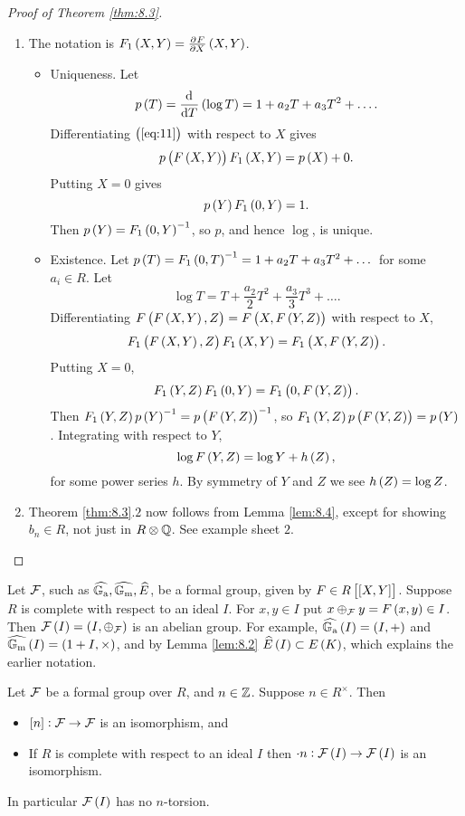 \pagebreak

\begin{proof}[Proof of Theorem \ref{thm:8.3}]
\hfill
\begin{enumerate}
\item The notation is $ F_1\br{X, Y} = \tpd{F}{X}\br{X, Y} $.
\begin{itemize}
\item Uniqueness. Let
$$ p\br{T} = \dod{}{T}\br{\log T} = 1 + a_2T + a_3T^2 + \dots. $$
Differentiating $ \br{\ref{eq:11}} $ with respect to $ X $ gives
$$ p\br{F\br{X, Y}}F_1\br{X, Y} = p\br{X} + 0. $$
Putting $ X = 0 $ gives
$$ p\br{Y}F_1\br{0, Y} = 1. $$
Then $ p\br{Y} = F_1\br{0, Y}^{-1} $, so $ p $, and hence $ \log $, is unique.
\item Existence. Let $ p\br{T} = F_1\br{0, T}^{-1} = 1 + a_2T + a_3T^2 + \dots $ for some $ a_i \in R $. Let
$$ \log T = T + \dfrac{a_2}{2}T^2 + \dfrac{a_3}{3}T^3 + \dots. $$
Differentiating $ F\br{F\br{X, Y}, Z} = F\br{X, F\br{Y, Z}} $ with respect to $ X $,
$$ F_1\br{F\br{X, Y}, Z}F_1\br{X, Y} = F_1\br{X, F\br{Y, Z}}. $$
Putting $ X = 0 $,
$$ F_1\br{Y, Z}F_1\br{0, Y} = F_1\br{0, F\br{Y, Z}}. $$
Then $ F_1\br{Y, Z}p\br{Y}^{-1} = p\br{F\br{Y, Z}}^{-1} $, so $ F_1\br{Y, Z}p\br{F\br{Y, Z}} = p\br{Y} $. Integrating with respect to $ Y $,
$$ \log F\br{Y, Z} = \log Y + h\br{Z}, $$
for some power series $ h $. By symmetry of $ Y $ and $ Z $ we see $ h\br{Z} = \log Z $.
\end{itemize}
\item Theorem \ref{thm:8.3}.$ 2 $ now follows from Lemma \ref{lem:8.4}, except for showing $ b_n \in R $, not just in $ R \otimes \mathbb{Q} $. See example sheet $ 2 $.
\end{enumerate}
\end{proof}

\begin{notation*}
Let $ \mathcal{F} $, such as $ \widehat{\mathbb{G}_{\mathrm{a}}}, \widehat{\mathbb{G}_{\mathrm{m}}}, \widehat{E} $, be a formal group, given by $ F \in R\sbr{\sbr{X, Y}} $. Suppose $ R $ is complete with respect to an ideal $ I $. For $ x, y \in I $ put $ x \oplus_\FFF y = F\br{x, y} \in I $. Then $ \FFF\br{I} = \br{I, \oplus_\FFF} $ is an abelian group. For example, $ \widehat{\GG_\a}\br{I} = \br{I, +} $ and $ \widehat{\GG_\m}\br{I} = \br{1 + I, \times} $, and by Lemma \ref{lem:8.2} $ \widehat{E}\br{I} \subset E\br{K} $, which explains the earlier notation.
\end{notation*}

\begin{corollary}
\label{cor:8.5}
Let $ \mathcal{F} $ be a formal group over $ R $, and $ n \in \mathbb{Z} $. Suppose $ n \in R^\times $. Then
\begin{itemize}
\item $ \sbr{n} : \FFF \to \FFF $ is an isomorphism, and
\item If $ R $ is complete with respect to an ideal $ I $ then $ \cdot n : \FFF\br{I} \to \FFF\br{I} $ is an isomorphism.
\end{itemize}
In particular $ \FFF\br{I} $ has no $ n $-torsion.
\end{corollary}

